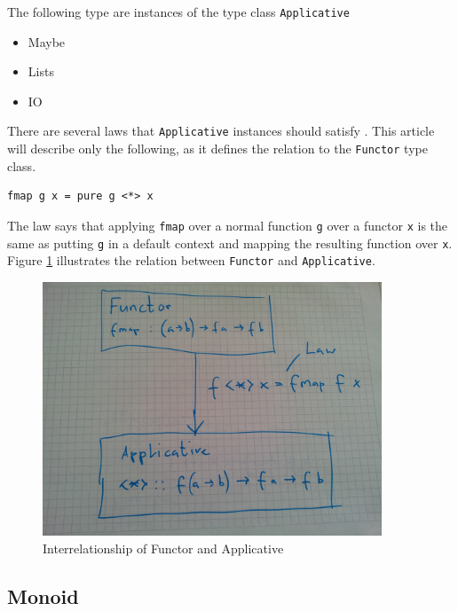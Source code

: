 The following type are instances of the type class \verb|Applicative|

\begin{itemize}
\item Maybe
\item Lists
\item IO
\end{itemize}

There are several laws that \verb|Applicative| instances should satisfy \cite{mcbride} \cite{control.applicative}. This article will describe only the following, as it defines the relation to the \verb|Functor| type class.

\begin{verbatim}
fmap g x = pure g <*> x
\end{verbatim}

The law says that applying \verb|fmap| over a normal function \verb|g| over a functor \verb|x| is the same as putting \verb|g| in a default context and mapping the resulting function over \verb|x|. Figure \ref{fig:functor_applicative} illustrates the relation between \verb|Functor| and \verb|Applicative|.

\begin{figure}
  \centering
     \includegraphics[width=0.9\textwidth]{functor_applicative}
  \caption{Interrelationship of Functor and Applicative}
  \label{fig:functor_applicative}
\end{figure}

\subsection{Monoid}
\label{sec:monoid}

